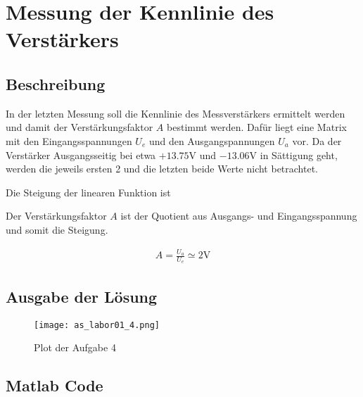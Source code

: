 \section{Messung der Kennlinie des Verstärkers}

\subsection{Beschreibung}

In der letzten Messung soll die Kennlinie des Messverstärkers ermittelt
werden und damit der Verstärkungsfaktor $A$ bestimmt werden. Dafür liegt
eine Matrix mit den Eingangsspannungen $U_e$ und den Ausgangspannungen
$U_a$ vor.
Da der Verstärker Ausgangsseitig bei etwa $+13.75\mathrm{V}$ und 
$-13.06\mathrm{V}$ in Sättigung geht, werden die jeweils ersten 2
und die letzten beide Werte nicht betrachtet.

Die Steigung der linearen Funktion ist 

Der Verstärkungsfaktor $A$ ist der Quotient aus Ausgangs- und Eingangsspannung
und somit die Steigung.

\begin{equation} \label{eq141}
    \begin{split}
        A=\frac{U_a}{U_e}\simeq2 \mathrm{V}
    \end{split}
\end{equation}



\subsection{Ausgabe der Lösung}
\begin{figure}[H]
 \centering
 \texttt{[image: as\_labor01\_4.png]}
 \caption{Plot der Aufgabe 4}
 \label{fig:PlotAufgabe4}
\end{figure}

\subsection{Matlab Code}


